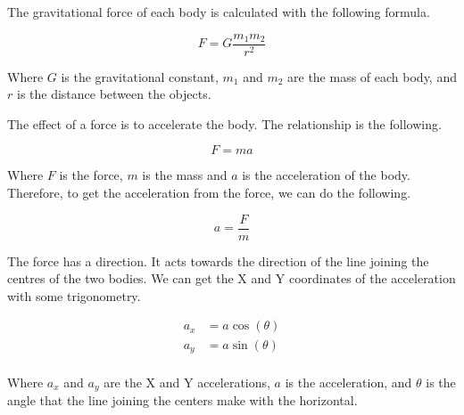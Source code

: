 \documentclass{amsart}
\begin{document}
The gravitational force of each body is calculated with the following formula.

\begin{displaymath}
  F = G \frac{m_1m_2}{r^2}
\end{displaymath}

Where $G$ is the gravitational constant, $m_1$ and $m_2$ are the mass of each
body, and $r$ is the distance between the objects.

The effect of a force is to accelerate the body. The relationship is the
following.

\begin{displaymath}
  F = m a
\end{displaymath}

Where $F$ is the force, $m$ is the mass and $a$ is the acceleration of the
body. Therefore, to get the acceleration from the force, we can do the
following.

\begin{displaymath}
  a = \frac{F}{m}
\end{displaymath}

The force has a direction. It acts towards the direction of the line joining
the centres of the two bodies. We can get the X and Y coordinates of the
acceleration with some trigonometry.

\begin{align*}
  a_x &= a \cos(\theta) \\
  a_y &= a \sin(\theta) \\
\end{align*}

Where $a_x$ and $a_y$ are the X and Y accelerations, $a$ is the acceleration,
and $\theta$ is the angle that the line joining the centers make with the
horizontal.

\end{document}
